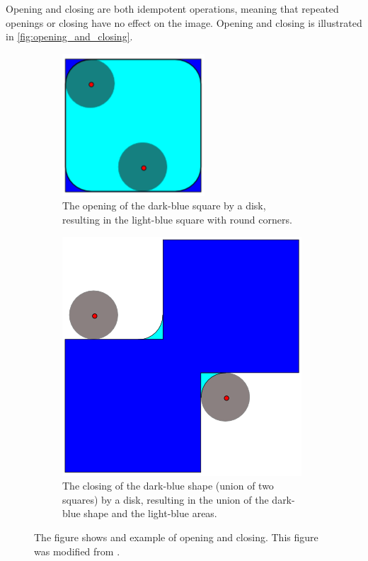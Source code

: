 Opening and closing are both idempotent operations, meaning that repeated openings or closing have no effect on the image. Opening and closing is illustrated in \autoref{fig:opening_and_closing}.
\begin{figure}[!htb]
  \centering
  \begin{subfigure}[t]{0.45\textwidth}
    \centering
    \includegraphics[width=0.5\linewidth]{figures/detection/opening.png}
    \caption{The opening of the dark-blue square by a disk, resulting in the light-blue square with round corners.}
    \label{fig:opening}
  \end{subfigure}
  \quad
  \begin{subfigure}[t]{0.45\textwidth}
    \centering
    \includegraphics[width=0.5\linewidth]{figures/detection/closing.png}
    \caption{The closing of the dark-blue shape (union of two squares) by a disk, resulting in the union of the dark-blue shape and the light-blue areas.}
    \label{fig:closing}
  \end{subfigure}
  \caption{The figure shows and example of opening and closing. This figure was modified from \cite{Renatokeshet_2023}.}
  \label{fig:opening_and_closing}
\end{figure}


